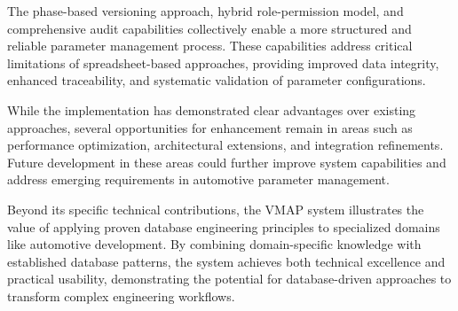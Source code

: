 The phase-based versioning approach, hybrid role-permission model, and comprehensive audit capabilities collectively enable a more structured and reliable parameter management process. These capabilities address critical limitations of spreadsheet-based approaches, providing improved data integrity, enhanced traceability, and systematic validation of parameter configurations.

While the implementation has demonstrated clear advantages over existing approaches, several opportunities for enhancement remain in areas such as performance optimization, architectural extensions, and integration refinements. Future development in these areas could further improve system capabilities and address emerging requirements in automotive parameter management.

Beyond its specific technical contributions, the \ac{VMAP} system illustrates the value of applying proven database engineering principles to specialized domains like automotive development. By combining domain-specific knowledge with established database patterns, the system achieves both technical excellence and practical usability, demonstrating the potential for database-driven approaches to transform complex engineering workflows.